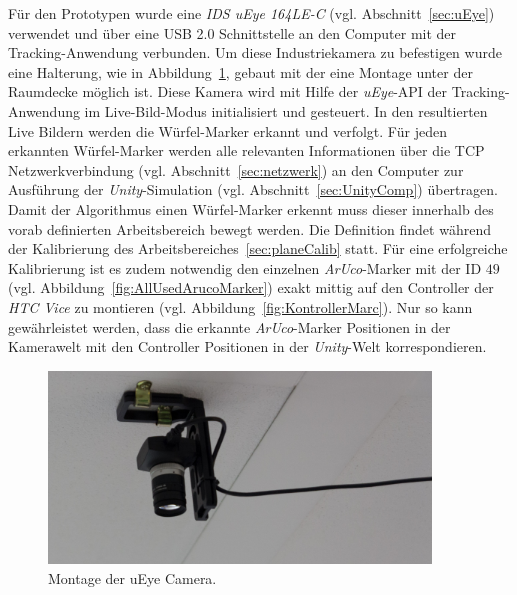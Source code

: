 Für den Prototypen wurde eine \textit{IDS uEye 164LE-C} (vgl. Abschnitt~\ref{sec:uEye}) verwendet und über eine USB 2.0 Schnittstelle an den Computer mit der Tracking-Anwendung verbunden. Um diese Industriekamera zu befestigen wurde eine Halterung, wie in Abbildung~\ref{fig:uEyeMontage}, gebaut mit der eine Montage unter der Raumdecke möglich ist. Diese Kamera wird mit Hilfe der \textit{uEye}-API der Tracking-Anwendung im Live-Bild-Modus initialisiert und gesteuert. In den resultierten Live Bildern werden die Würfel-Marker erkannt und verfolgt. Für jeden erkannten Würfel-Marker werden alle relevanten Informationen über die TCP Netzwerkverbindung (vgl. Abschnitt~\ref{sec:netzwerk}) an den Computer zur Ausführung der \textit{Unity}-Simulation (vgl. Abschnitt~\ref{sec:UnityComp}) übertragen. Damit der Algorithmus einen Würfel-Marker erkennt muss dieser innerhalb des vorab definierten Arbeitsbereich bewegt werden. Die Definition findet während der Kalibrierung des Arbeitsbereiches~\ref{sec:planeCalib} statt. Für eine erfolgreiche Kalibrierung ist es zudem notwendig den einzelnen \textit{ArUco}-Marker mit der ID $49$ (vgl. Abbildung~\ref{fig:AllUsedArucoMarker}) exakt mittig auf den Controller der \textit{HTC Vice} zu montieren (vgl. Abbildung~\ref{fig:KontrollerMarc}). Nur so kann gewährleistet werden, dass die erkannte \textit{ArUco}-Marker Positionen in der Kamerawelt mit den Controller Positionen in der \textit{Unity}-Welt korrespondieren.

\begin{figure}[H]
	\centering
	\includegraphics[width=4in]{Bilder/Eigene Fotos/IMG_0020.jpg}			
	\caption{Montage der uEye Camera.}
	\label{fig:uEyeMontage}
\end{figure}

